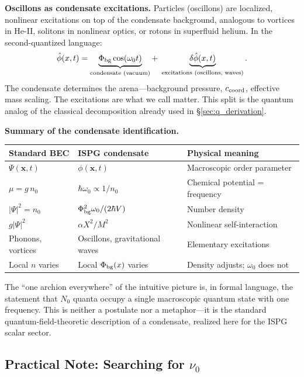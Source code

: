 \documentclass[11pt]{article}
\begin{document}
\medskip
\textbf{Oscillons as condensate excitations.}
Particles (oscillons) are localized, nonlinear excitations
on top of the condensate background, analogous to vortices
in He-II, solitons in nonlinear optics, or rotons in
superfluid helium.  In the second-quantized language:
\begin{equation}
  \hat\phi(x,t) = \underbrace{
    \Phi_{\rm bg}\cos(\omega_0 t)
  }_{\text{condensate (vacuum)}}
  +\; \underbrace{
    \delta\hat\phi(x,t)
  }_{\text{excitations (oscillons, waves)}}.
  \label{eq:field_split}
\end{equation}
The condensate determines the arena---background pressure,
$c_{\rm coord}$, effective mass scaling.  The excitations
are what we call matter.  This split is the quantum analog
of the classical decomposition already used in
\S\ref{sec:q_derivation}.

\medskip
\textbf{Summary of the condensate identification.}
\begin{center}
\begin{tabular}{lll}
\hline
\textbf{Standard BEC} & \textbf{ISPG condensate}
  & \textbf{Physical meaning} \\
\hline
$\Psi(\mathbf{x},t)$
  & $\phi(\mathbf{x},t)$
  & Macroscopic order parameter \\
$\mu = g\,n_0$
  & $\hbar\omega_0 \propto 1/n_0$
  & Chemical potential = frequency \\
$|\Psi|^2 = n_0$
  & $\Phi_{\rm bg}^2\omega_0/(2\hbar V)$
  & Number density \\
$g|\Psi|^2$
  & $\alpha X^2/M^2$
  & Nonlinear self-interaction \\
Phonons, vortices
  & Oscillons, gravitational waves
  & Elementary excitations \\
Local $n$ varies
  & Local $\Phi_{\rm bg}(x)$ varies
  & Density adjusts; $\omega_0$ does not \\
\hline
\end{tabular}
\end{center}
The ``one archion everywhere'' of the intuitive picture
is, in formal language, the statement that $N_0$ quanta
occupy a single macroscopic quantum state with one
frequency.  This is neither a postulate nor a metaphor---it
is the standard quantum-field-theoretic description of a
condensate, realized here for the ISPG scalar sector.

\subsection{Practical Note: Searching for $\nu_0$}
\end{document}
